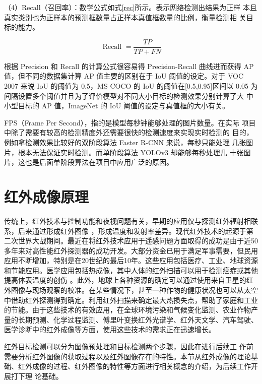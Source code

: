 （4）Recall（召回率）：数学公式如式\ref{rec}所示。表示网络检测出结果为正样
本且真实类别也为正样本的预测框数量占正样本真值框数量的比例，衡量检测相
关目标的能力。

\begin{equation}
     \text { Recall }=\frac{T P}{T P+F N}
    \label{rec}
\end{equation}

根据 Precision 和 Recall 的计算公式很容易得 Precision-Recall 曲线进而获得
AP 值，但不同的数据集计算 AP 值主要的区别在于 IoU 阈值的设定。对于 VOC
2007 来说 IoU 的阈值为 0.5，MS COCO 的 IoU 的阈值在[0.5,0.95]区间以 0.05 为
间隔设置多个阈值并且为了评价模型对不同大小目标的检测效果分别计算了大
中小型目标的 AP 值，ImageNet 的 IoU 阈值的设定与真值框的大小有关。

FPS（Frame Per Second），指的是模型每秒钟能够处理的图片数量。在实际
项目中除了需要有较高的检测精度外还需要很快的检测速度来实现实时检测的
目的，例如拿检测效果比较好的双阶段算法 Faster R-CNN 来说，每秒只能处理
几张图片，根本无法保证实时检测。而单阶段算法 YOLOv3 却能够每秒处理几
十张图片，这也是后面单阶段算法在项目中应用广泛的原因。

\section{红外成像原理}
传统上，红外技术与控制功能和夜视问题有关，早期的应用仅与探测红外辐射相联系，后来通过形成红外图像
，形成温度和发射率差异\cite{rogalski2002infrared}。现代红外技术的起源于第二次世界大战期间。最近在将红外技术应用于遥感问题方面取得的成功是由于近50多年来对高性能红外探测器的成功开发。大部分资金已用于满足军事需要，但民用应用不断增加，特别是在20世纪的最后10年。这些应用包括医疗、工业、地球资源和节能应用。医学应用包括热成像，其中人体的红外扫描可以用于检测癌症或其他提高体表温度的创伤
。此外，地球上各种资源的确定可以通过使用来自卫星的红外图像与现场观察的校准。在某些情况下，甚至一种作物的健康状况也可以从太空中借助红外探测得到确定。利用红外扫描来确定最大热损失点，帮助了家庭和工业的节能。由于这些技术的有效应用，在全球环境污染和气候变化监测、农业作物产量的长期预测、化学过程监测、傅里叶变换红外光谱学、红外天文学、汽车驾驶、医学诊断中的红外成像等方面，使用这些技术的需求正在迅速增长。

红外目标检测可以分为图像预处理和目标检测两个步骤，因此在进行后续工
作前需要分析红外图像的获取过程以及红外图像存在的特性。本节从红外成像的理论基础、红外成像的过程、红外图像的特性等方面进行相关概念的介绍，为后续工作开展打下理
论基础。

